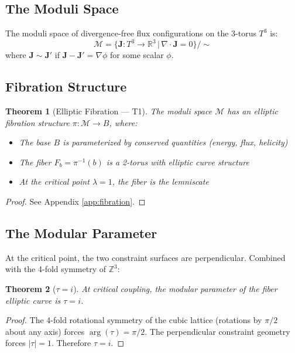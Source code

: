 \documentclass[11pt,a4paper]{article}
\newtheorem{theorem}{Theorem}[section]
\theoremstyle{definition}
\theoremstyle{remark}
\newcommand{\Zthree}{\mathbb{Z}^3}
\newcommand{\Rthree}{\mathbb{R}^3}
\begin{document}
\subsection{The Moduli Space}

The moduli space of divergence-free flux configurations on the 3-torus $T^3$ is:
\begin{equation}
    \mathcal{M} = \{ \mathbf{J} : T^3 \to \Rthree \,|\, \nabla \cdot \mathbf{J} = 0 \} / \sim
\end{equation}
where $\mathbf{J} \sim \mathbf{J}'$ if $\mathbf{J} - \mathbf{J}' = \nabla \phi$ for some scalar $\phi$.

\subsection{Fibration Structure}

\begin{theorem}[Elliptic Fibration --- T1]
The moduli space $\mathcal{M}$ has an elliptic fibration structure $\pi: \mathcal{M} \to B$, where:
\begin{itemize}
    \item The base $B$ is parameterized by conserved quantities (energy, flux, helicity)
    \item The fiber $F_b = \pi^{-1}(b)$ is a 2-torus with elliptic curve structure
    \item At the critical point $\lambda = 1$, the fiber is the lemniscate
\end{itemize}
\end{theorem}

\begin{proof}
See Appendix \ref{app:fibration}.
\end{proof}

\subsection{The Modular Parameter}

At the critical point, the two constraint surfaces are perpendicular. Combined with the 4-fold symmetry of $\Zthree$:

\begin{theorem}[$\tau = i$]
At critical coupling, the modular parameter of the fiber elliptic curve is $\tau = i$.
\end{theorem}

\begin{proof}
The 4-fold rotational symmetry of the cubic lattice (rotations by $\pi/2$ about any axis) forces $\arg(\tau) = \pi/2$. The perpendicular constraint geometry forces $|\tau| = 1$. Therefore $\tau = i$.
\end{proof}
\end{document}
